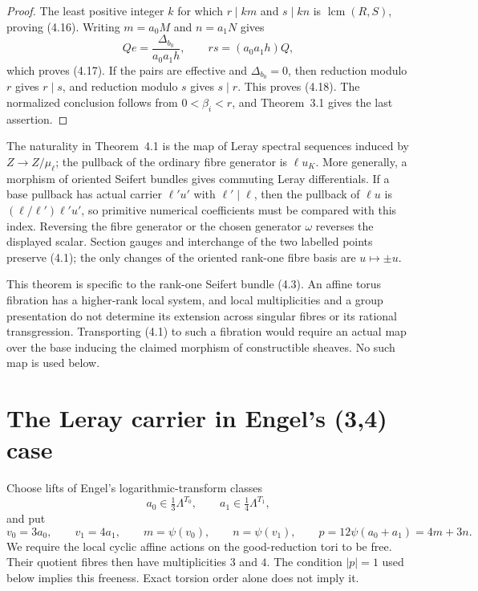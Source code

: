 \documentclass[11pt]{article}
\numberwithin{equation}{section}
\begin{document}
\begin{proof}
The least positive integer $k$ for which $r\mid km$ and $s\mid kn$ is
$\operatorname{lcm}(R,S)$, proving (4.16).  Writing
$m=a_0M$ and $n=a_1N$ gives
\[
 Qe=\frac{\Delta_{b_0}}{a_0a_1h},
 \qquad rs=(a_0a_1h)Q,
\]
which proves (4.17).  If the pairs are effective and $\Delta_{b_0}=0$, then
reduction modulo $r$ gives $r\mid s$, and reduction modulo $s$ gives
$s\mid r$.  This proves (4.18).  The normalized conclusion follows from
$0<\beta_i<r$, and Theorem~3.1 gives the last assertion.
\end{proof}

\begin{remark}
The naturality in Theorem~4.1 is the map of Leray spectral sequences induced
by $Z\to Z/\mu_\ell$; the pullback of the ordinary fibre generator is
$\ell u_K$.  More generally, a morphism of oriented Seifert bundles gives
commuting Leray differentials.  If a base pullback has actual carrier
$\ell'u'$ with $\ell'\mid\ell$, then the pullback of $\ell u$ is
$(\ell/\ell')\ell'u'$, so primitive numerical coefficients must be compared
with this index.  Reversing the fibre generator or the chosen generator
$\omega$ reverses the displayed scalar.  Section gauges and interchange of
the two labelled points preserve (4.1); the only changes of the oriented
rank-one fibre basis are $u\mapsto\pm u$.

This theorem is specific to the rank-one Seifert bundle (4.3).  An affine
torus fibration has a higher-rank local system, and local multiplicities and
a group presentation do not determine its extension across singular fibres
or its rational transgression.  Transporting (4.1) to such a fibration would
require an actual map over the base inducing the claimed morphism of
constructible sheaves.  No such map is used below.
\end{remark}

\section{The Leray carrier in Engel's (3,4) case}

Choose lifts of Engel's logarithmic-transform classes
\[
 a_0\in\tfrac13\Lambda^{T_0},\qquad
 a_1\in\tfrac14\Lambda^{T_1},
\]
and put
\[
 v_0=3a_0,\qquad v_1=4a_1,\qquad
 m=\psi(v_0),\qquad n=\psi(v_1),\qquad
 p=12\psi(a_0+a_1)=4m+3n.                                        \tag{5.1}
\]
We require the local cyclic affine actions on the good-reduction tori to
be free.  Their quotient fibres then have multiplicities $3$ and $4$.
The condition $|p|=1$ used below implies this freeness.  Exact torsion
order alone does not imply it.
\end{document}
